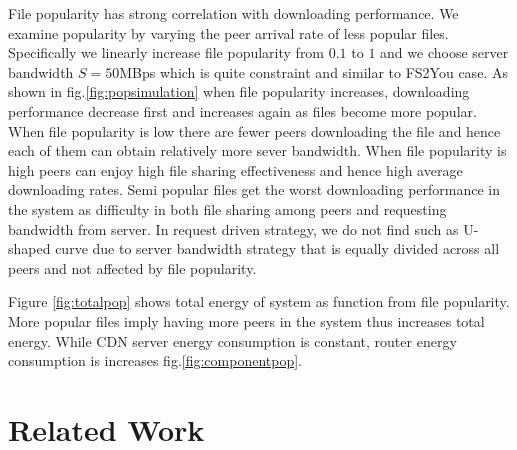 \documentclass[conference]{IEEEtran}
\begin{document}
File popularity has strong correlation with downloading performance. 
We examine popularity by varying the peer arrival rate of less popular files.
Specifically we linearly increase file popularity from $0.1$ to $1$ and we choose server bandwidth $S=50$MBps which is quite constraint and similar to FS2You case.
As shown in fig.\ref{fig:popsimulation} when file popularity increases, downloading performance decrease first and increases again as files become more popular.
When file popularity is low there are fewer peers downloading the file and hence each of them can obtain relatively more sever bandwidth.
When file popularity is high peers can enjoy high file sharing effectiveness and hence high average downloading rates.
Semi popular files get the worst downloading performance in the system as difficulty in both file sharing among peers and requesting bandwidth from server.
In request driven strategy, we do not find such as U-shaped curve due to server bandwidth strategy that is equally divided across all peers and not affected by file popularity.

Figure \ref{fig:totalpop} shows total energy of system as function from file popularity.  
More popular files imply having more peers in the system thus increases total energy.  
While CDN server energy consumption is constant, router energy consumption is increases fig.\ref{fig:componentpop}. 



\section{Related Work} 
\end{document}
